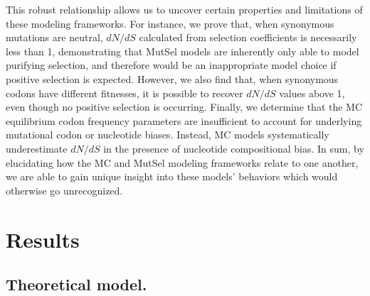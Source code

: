 \documentclass{pnastwo}
\begin{document}
\begin{article}
This robust relationship allows us to uncover certain properties and limitations of these modeling frameworks. For instance, we prove that, when synonymous mutations are neutral, $dN/dS$ calculated from selection coefficients is necessarily less than 1, demonstrating that MutSel models are inherently only able to model purifying selection, and therefore would be an inappropriate model choice if positive selection is expected. However, we also find that, when synonymous codons have different fitnesses, it is possible to recover $dN/dS$ values above 1, even though no positive selection is occurring. Finally, we determine that the MC equilibrium codon frequency parameters are insufficient to account for underlying mutational codon or nucleotide biases. Instead, MC models systematically underestimate $dN/dS$ in the presence of nucleotide compositional bias. In sum, by elucidating how the MC and MutSel modeling frameworks relate to one another, we are able to gain unique insight into these models’ behaviors which would otherwise go unrecognized.
		
		
\section*{Results}
		
		
\subsection*{Theoretical model.}


\end{article}
\end{document}
